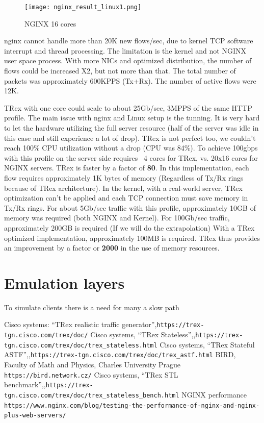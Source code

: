 \documentclass[conference]{IEEEtran}
\begin{document}
\begin{figure}[h]
  \texttt{[image: nginx\_result\_linux1.png]}
  \caption{NGINX 16 cores}
  \label{fig:trex_nginx_r2}
\end{figure}

nginx cannot handle more than 20K new flows/sec, due to kernel TCP software interrupt and thread processing. 
The limitation is the kernel and not NGINX user space process.
 With more NICs and optimized distribution, the number of flows could be increased X2, but not more than that. 
 The total number of packets was approximately 600KPPS (Tx+Rx). The number of active flows were 12K.

TRex with one core could scale to about 25Gb/sec, 3MPPS of the same HTTP profile.
The main issue with nginx and Linux setup is the tunning. 
It is very hard to let the hardware utilizing the full server resource (half of the server was idle in this case and still experience a lot of drop). 
TRex is not perfect too, we couldn't reach 100\% CPU utilization without a drop (CPU was 84\%). To achieve 100gbps with this profile on the server side requires ~4 cores for TRex, vs. 20x16 cores for NGINX servers. 
TRex is faster by a factor of \textbf{80}. In this implementation, each flow requires approximately 1K bytes of memory (Regardless of Tx/Rx rings because of TRex architecture). 
In the kernel, with a real-world server, TRex optimization can't be applied and each TCP connection must save memory in Tx/Rx rings.
For about 5Gb/sec traffic with this profile, approximately 10GB of memory was required (both NGINX and Kernel). For 100Gb/sec traffic, approximately 200GB is required (If we will do the extrapolation)  With a TRex optimized implementation, approximately 100MB is required. 
TRex thus provides an improvement by a factor or \textbf{2000} in the use of memory resources.

\section{Emulation layers}

To simulate clients there is a need for many a slow path 

\begin{thebibliography}{00}
 Cisco systems: ``TRex realistic traffic generator'',\texttt{https://trex-tgn.cisco.com/trex/doc/}
 Cisco systems, ``TRex Stateless'',,\texttt{https://trex-tgn.cisco.com/trex/doc/trex\_stateless.html}
 Cisco systems, ``TRex Stateful ASTF'',,\texttt{https://trex-tgn.cisco.com/trex/doc/trex\_astf.html}
 BIRD, Faculty of Math and Physics, Charles University Prague \texttt{https://bird.network.cz/}
 Cisco systems, ``TRex STL benchmark'',,\texttt{https://trex-tgn.cisco.com/trex/doc/trex\_stateless\_bench.html}
 NGINX performance  \texttt{https://www.nginx.com/blog/testing-the-performance-of-nginx-and-nginx-plus-web-servers/}
\end{thebibliography}
\end{document}
